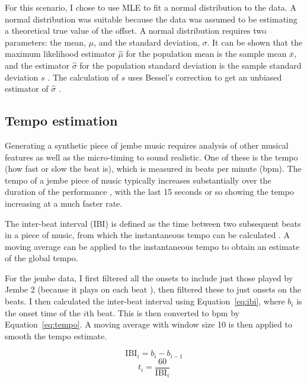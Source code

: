 \documentclass[12pt,twoside,openright]{report}
\begin{document}
For this scenario, I chose to use MLE to fit a normal distribution to the data.
A normal distribution was suitable because the data was assumed to be estimating
a theoretical true value of the offset. A normal distribution requires two
parameters: the mean, $\mu$, and the standard deviation, $\sigma$. It can be shown that the
maximum likelihood estimator $\hat{\mu}$ for the population mean is the sample mean $\bar{x}$,
and the estimator $\hat{\sigma}$ for the population standard deviation is the sample
standard deviation $s$ \cite{dekking2005}. The calculation of $s$ uses Bessel's
correction to get an unbiased estimator of $\hat{\sigma}$ \cite{upton2014}.


\subsection{Tempo estimation} \label{tempo_estimation}

Generating a synthetic piece of jembe music requires analysis of other musical
features as well as the micro-timing to sound realistic. One of these is the
tempo (how fast or slow the beat is), which is measured in beats per minute
(bpm). The tempo of a jembe piece of music typically increases substantially
over the duration of the performance \cite{jacoby2021}, with the last 15 seconds or
so showing the tempo increasing at a much faster rate.

The inter-beat interval (IBI) is defined as the time between two subsequent beats in a
piece of music, from which the instantaneous tempo can be calculated \cite{dixon2001}.
A moving average can be applied to the instantaneous tempo to obtain an estimate
of the global tempo.

For the jembe data, I first filtered all the onsets to include just those played
by Jembe 2 (because it plays on each beat \cite{jacoby2021}), then filtered these to
just onsets on the beats. I then calculated the inter-beat interval using Equation~\ref{eq:ibi}, where $b_i$ is the onset time of the $i$th beat. This is then converted to bpm by Equation~\ref{eq:tempo}. A moving average with window size 10 is then applied to smooth the tempo estimate.

\begin{equation}
    \mathrm{IBI}_i = b_i - b_{i-1}
    \label{eq:ibi}
\end{equation}
\begin{equation}
    t_i = \frac{60}{\mathrm{IBI}_i}
    \label{eq:tempo}
\end{equation}
\end{document}
